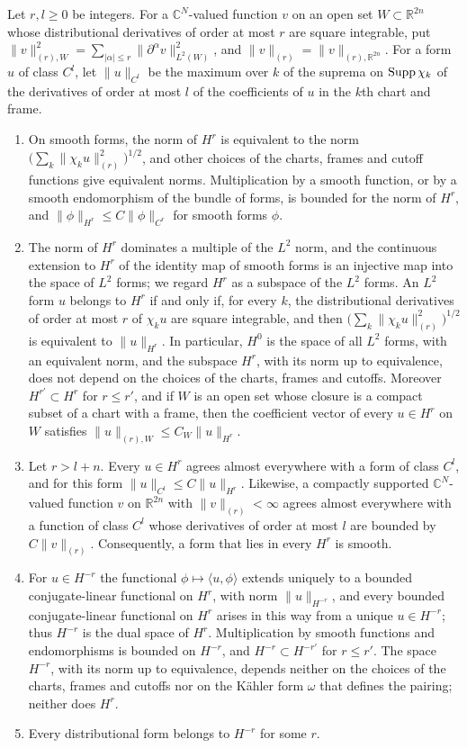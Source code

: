 \begin{lemma}\label{lem:compact-sobolev-spaces}
Let $r,l\geq0$ be integers. For a $\mathbb C^N$-valued function $v$ on an open set $W\subset\mathbb R^{2n}$ whose distributional derivatives of order at most $r$ are square integrable, put $\|v\|_{(r),W}^2=\sum_{|\alpha|\leq r}\|\partial^\alpha v\|_{L^2(W)}^2$, and $\|v\|_{(r)}=\|v\|_{(r),\mathbb R^{2n}}$. For a form $u$ of class $C^l$, let $\|u\|_{C^l}$ be the maximum over $k$ of the suprema on $\operatorname{Supp}\chi_k$ of the derivatives of order at most $l$ of the coefficients of $u$ in the $k$th chart and frame.
\begin{enumerate}
\item On smooth forms, the norm of $H^r$ is equivalent to the norm $\bigl(\sum_k\|\chi_ku\|_{(r)}^2\bigr)^{1/2}$, and other choices of the charts, frames and cutoff functions give equivalent norms. Multiplication by a smooth function, or by a smooth endomorphism of the bundle of forms, is bounded for the norm of $H^r$, and $\|\phi\|_{H^r}\leq C\|\phi\|_{C^r}$ for smooth forms $\phi$.
\item The norm of $H^r$ dominates a multiple of the $L^2$ norm, and the continuous extension to $H^r$ of the identity map of smooth forms is an injective map into the space of $L^2$ forms; we regard $H^r$ as a subspace of the $L^2$ forms. An $L^2$ form $u$ belongs to $H^r$ if and only if, for every $k$, the distributional derivatives of order at most $r$ of $\chi_ku$ are square integrable, and then $\bigl(\sum_k\|\chi_ku\|_{(r)}^2\bigr)^{1/2}$ is equivalent to $\|u\|_{H^r}$. In particular, $H^0$ is the space of all $L^2$ forms, with an equivalent norm, and the subspace $H^r$, with its norm up to equivalence, does not depend on the choices of the charts, frames and cutoffs. Moreover $H^{r'}\subset H^r$ for $r\leq r'$, and if $W$ is an open set whose closure is a compact subset of a chart with a frame, then the coefficient vector of every $u\in H^r$ on $W$ satisfies $\|u\|_{(r),W}\leq C_W\|u\|_{H^r}$.
\item Let $r>l+n$. Every $u\in H^r$ agrees almost everywhere with a form of class $C^l$, and for this form $\|u\|_{C^l}\leq C\|u\|_{H^r}$. Likewise, a compactly supported $\mathbb C^N$-valued function $v$ on $\mathbb R^{2n}$ with $\|v\|_{(r)}<\infty$ agrees almost everywhere with a function of class $C^l$ whose derivatives of order at most $l$ are bounded by $C\|v\|_{(r)}$. Consequently, a form that lies in every $H^r$ is smooth.
\item For $u\in H^{-r}$ the functional $\phi\mapsto\langle u,\phi\rangle$ extends uniquely to a bounded conjugate-linear functional on $H^r$, with norm $\|u\|_{H^{-r}}$, and every bounded conjugate-linear functional on $H^r$ arises in this way from a unique $u\in H^{-r}$; thus $H^{-r}$ is the dual space of $H^r$. Multiplication by smooth functions and endomorphisms is bounded on $H^{-r}$, and $H^{-r}\subset H^{-r'}$ for $r\leq r'$. The space $H^{-r}$, with its norm up to equivalence, depends neither on the choices of the charts, frames and cutoffs nor on the K\"ahler form $\omega$ that defines the pairing; neither does $H^r$.
\item Every distributional form belongs to $H^{-r}$ for some $r$.
\end{enumerate}
\end{lemma}
